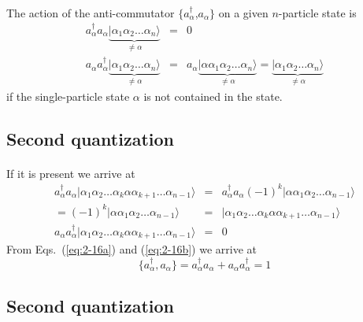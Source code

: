 \documentclass[%
twoside,                 %
final,                   %
10pt]{article}
\begin{document}
\paragraph{}
The action of the anti-commutator 
$\{a_\alpha^{\dagger}$,$a_\alpha\}$ on a given $n$-particle state is
\begin{eqnarray}
	a_\alpha^{\dagger} a_\alpha \underbrace{|\alpha_1\alpha_2 \dots \alpha_{n}\rangle}_{\neq \alpha} &=& 0 \nonumber \\
	a_\alpha a_\alpha^{\dagger} \underbrace{|\alpha_1\alpha_2 \dots \alpha_{n}\rangle}_{\neq \alpha} &=&
	a_\alpha \underbrace{|\alpha \alpha_1\alpha_2 \dots \alpha_{n}\rangle}_{\neq \alpha} = 
	\underbrace{|\alpha_1\alpha_2 \dots \alpha_{n}\rangle}_{\neq \alpha} \label{eq:2-16a}
\end{eqnarray}
if the single-particle state $\alpha$ is not contained in the state.




\subsection*{Second quantization}

\paragraph{}
 If it is present
we arrive at
\begin{eqnarray}
	a_\alpha^{\dagger} a_\alpha |\alpha_1\alpha_2 \dots \alpha_{k}\alpha \alpha_{k+1} \dots \alpha_{n-1}\rangle &=&
	a_\alpha^{\dagger} a_\alpha (-1)^k |\alpha \alpha_1\alpha_2 \dots \alpha_{n-1}\rangle \nonumber \\
	= (-1)^k |\alpha \alpha_1\alpha_2 \dots \alpha_{n-1}\rangle &=& 
	|\alpha_1\alpha_2 \dots \alpha_{k}\alpha \alpha_{k+1} \dots \alpha_{n-1}\rangle \nonumber \\
	a_\alpha a_\alpha^{\dagger}|\alpha_1\alpha_2 \dots \alpha_{k}\alpha \alpha_{k+1} \dots \alpha_{n-1}\rangle &=& 0 \label{eq:2-16b}
\end{eqnarray}
From Eqs.~(\ref{eq:2-16a}) and  (\ref{eq:2-16b}) we arrive at 
\begin{equation}
	\{a_\alpha^{\dagger} , a_\alpha \} = a_\alpha^{\dagger} a_\alpha + a_\alpha a_\alpha^{\dagger} = 1 \label{eq:2-17}
\end{equation}




\subsection*{Second quantization}
\end{document}
